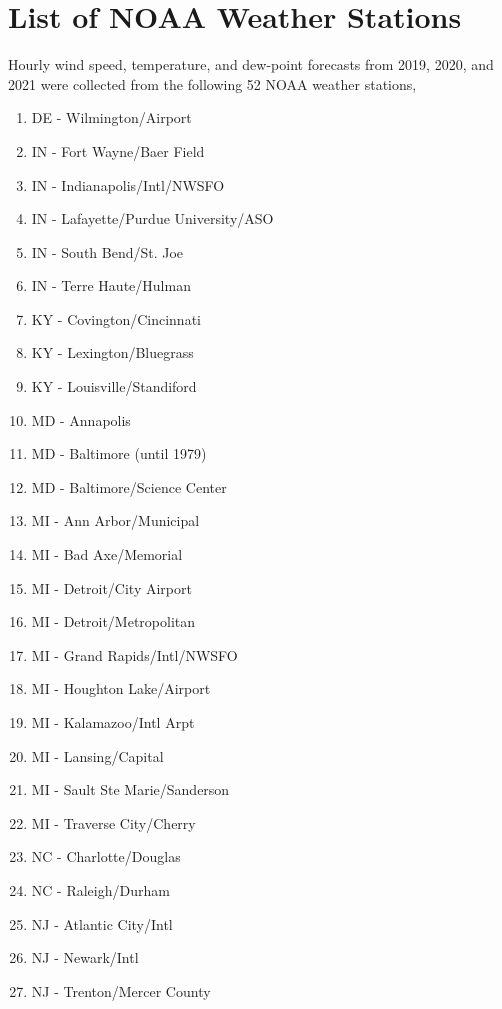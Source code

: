 \chapter{List of NOAA Weather Stations}\label{ch:list-of-noaa-weather-stations}

Hourly wind speed, temperature, and dew-point forecasts from 2019, 2020, and 2021 were collected from the following 52
NOAA weather stations,

\begin{multicols}{2}
{\footnotesize
\begin{enumerate}
    \item DE - Wilmington/Airport
    \item IN - Fort Wayne/Baer Field
    \item IN - Indianapolis/Intl/NWSFO
    \item IN - Lafayette/Purdue University/ASO
    \item IN - South Bend/St. Joe
    \item IN - Terre Haute/Hulman
    \item KY - Covington/Cincinnati
    \item KY - Lexington/Bluegrass
    \item KY - Louisville/Standiford
    \item MD - Annapolis
    \item MD - Baltimore (until 1979)
    \item MD - Baltimore/Science Center
    \item MI - Ann Arbor/Municipal
    \item MI - Bad Axe/Memorial
    \item MI - Detroit/City Airport
    \item MI - Detroit/Metropolitan
    \item MI - Grand Rapids/Intl/NWSFO
    \item MI - Houghton Lake/Airport
    \item MI - Kalamazoo/Intl Arpt
    \item MI - Lansing/Capital
    \item MI - Sault Ste Marie/Sanderson
    \item MI - Traverse City/Cherry
    \item NC - Charlotte/Douglas
    \item NC - Raleigh/Durham
    \item NJ - Atlantic City/Intl
    \item NJ - Newark/Intl
    \item NJ - Trenton/Mercer County

\end{enumerate}}
\end{multicols}
